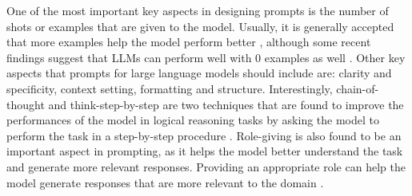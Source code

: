 One of the most important key aspects in designing prompts is the number of shots or examples that are given to the model. Usually, it is generally accepted that more examples help the model perform better \cite{brown2020language,reynolds2021prompt,prompt-learn,promt-eng}, although some recent findings suggest that LLMs can perform well with 0 examples as well \cite{NEURIPS2022_8bb0d291}. Other key aspects that prompts for large language models should include are: clarity and specificity, context setting, formatting and structure. Interestingly, chain-of-thought and think-step-by-step are two techniques that are found to improve the performances of the model in logical reasoning tasks by asking the model to perform the task in a step-by-step procedure \cite{wei2023chainofthought,hsieh2023distilling}.
Role-giving is also found to be an important aspect in prompting, as it helps the model better understand the task and generate more relevant responses. Providing an appropriate role can help the model generate responses that are more relevant to the domain \cite{prompt-learn}.


